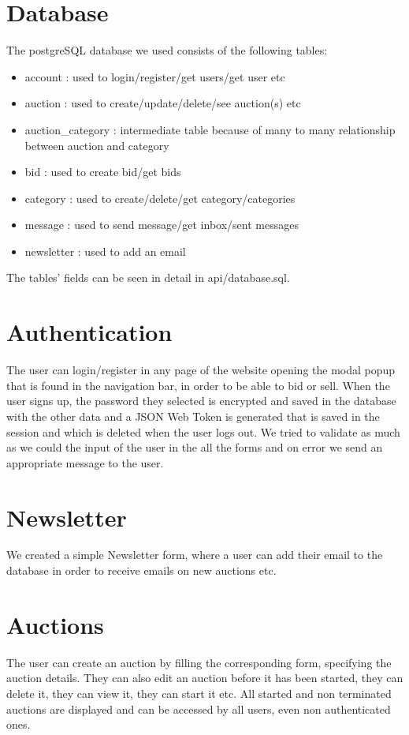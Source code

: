 \documentclass{article}
\begin{document}
\section{Database}
The postgreSQL database we used consists of the following tables:
\begin{itemize}
\item account : used to login/register/get users/get user etc
\item auction : used to create/update/delete/see auction(s) etc
\item auction\_category : intermediate table because of many to many relationship between auction and category
\item bid : used to create bid/get bids
\item category : used to create/delete/get category/categories
\item message : used to send message/get inbox/sent messages
\item newsletter : used to add an email
\end{itemize}
The tables' fields can be seen in detail in api/database.sql.

\section{Authentication}
The user can login/register in any page of the website opening the modal popup that is found in the navigation bar, in order to be able to bid or sell. When the user signs up, the password they selected is encrypted and saved in the database with the other data and a JSON Web Token is generated that is saved in the session and which is deleted when the user logs out. We tried to validate as much as we could the input of the user in the all the forms and on error we send an appropriate message to the user.

\section{Newsletter}
We created a simple Newsletter form, where a user can add their email to the database in order to receive emails on new auctions etc.

\section{Auctions}
The user can create an auction by filling the corresponding form, specifying the auction details. They can also edit an auction before it has been started, they can delete it, they can view it, they can start it etc. All started and non terminated auctions are displayed and can be accessed by all users, even non authenticated ones.
\end{document}
